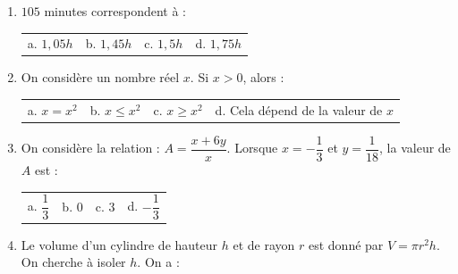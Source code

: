 \documentclass{article}
\begin{document}
\begin{enumerate}[left=0pt,itemsep=10pt]

\item $105$ minutes correspondent à :\\



\begin{tabular}{l@{\qquad}l@{\qquad}l@{\qquad}l}

a. $1,05h$ & b. $1,45h$ & c. $1,5h$ & d. $1,75h$ \\

\end{tabular}



\vspace{0.8cm}



\item On considère un nombre réel $x$. Si $x>0$, alors : \\



\begin{tabular}{l@{\qquad}l@{\qquad}l@{\qquad}l}

a. $x=x^2$ & b. $x \leq x^2$ & c. $x \geq x^2$ & d. Cela dépend de la valeur de $x$ \\

\end{tabular}



\vspace{0.8cm}



\item On considère la relation : $A=\dfrac{x+6y}{x}$. Lorsque $x=-\dfrac{1}{3}$ et $y=\dfrac{1}{18}$, la valeur de $A$ est : \\



\begin{tabular}{l@{\qquad}l@{\qquad}l@{\qquad}l}

a. $\dfrac{1}{3}$ & b. $0$ & c. $3$ & d. $-{\dfrac{1}{3}}$

\end{tabular}



\vspace{0.8cm}



\item Le volume d'un cylindre de hauteur $h$ et de rayon $r$ est donné par $V=\pi r^2 h$. On cherche à isoler $h$. On a : \\




\end{enumerate}
\end{document}
